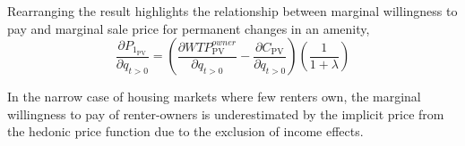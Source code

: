 \documentclass[ecta,nameyear,draft]{econsocart}
\theoremstyle{plain}
\theoremstyle{remark}
\begin{document}
Rearranging the result highlights the relationship between marginal willingness to pay and marginal sale price for permanent changes in an amenity,
\begin{equation}
	\frac{\partial P_{1_{\mathrm{PV}}}} {\partial q_{t>0}}=\left(
	\frac{\partial \mathit{WTP}^{\mathit{owner}}_{\mathrm{PV}}}{\partial q_{t>0}}-\frac{\partial C_{\mathrm{PV}}}{\partial q_{t>0}}\right)\left(\frac{1}{1+\lambda}\right) \label{marginalPriceOwner}
\end{equation}

In the narrow case of housing markets where few renters own, the marginal willingness to pay of renter-owners is underestimated by the implicit price from the hedonic price function due to the exclusion of income effects. 

%
%
\end{document}
